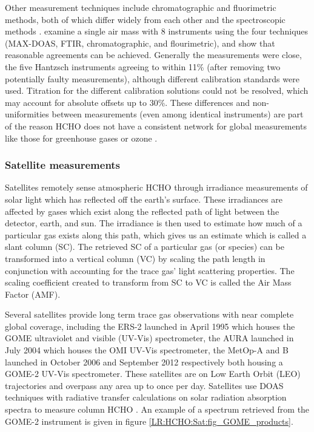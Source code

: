     Other measurement techniques include chromatographic and fluorimetric methods, both of which differ widely from each other and the spectroscopic methods \parencite{Hak2005}.
    \textcite{Hak2005} examine a single air mass with 8 instruments using the four techniques (MAX-DOAS, FTIR, chromatographic, and flourimetric), and show that reasonable agreements can be achieved.
    Generally the measurements were close, the five Hantzsch instruments agreeing to within 11\% (after removing two potentially faulty measurements), although different calibration standards were used.
    Titration for the different calibration solutions could not be resolved, which may account for absolute offsets up to 30\%.
    These differences and non-uniformities between measurements (even among identical instruments) are part of the reason HCHO does not have a consistent network for global measurements like those for greenhouse gases or ozone \parencite{FortemsCheiney2012}.
  
    \subsubsection{Satellite measurements}
      \label{LR:HCHO:Sat}
      
      Satellites remotely sense atmospheric HCHO through irradiance measurements of solar light which has reflected off the earth's surface. 
      These irradiances are affected by gases which exist along the reflected path of light between the detector, earth, and sun. 
      The irradiance is then used to estimate how much of a particular gas exists along this path, which gives us an estimate which is called a slant column (SC).
      The retrieved SC of a particular gas (or species) can be transformed into a vertical column (VC) by scaling the path length in conjunction with accounting for the trace gas' light scattering properties.
      The scaling coefficient created to transform from SC to VC is called the Air Mass Factor (AMF).
      
      Several satellites provide long term trace gas observations with near complete global coverage, including the ERS-2 launched in April 1995 which houses the GOME ultraviolet and visible (UV-Vis) spectrometer, the AURA launched in July 2004 which houses the OMI UV-Vis spectrometer, the MetOp-A and B launched in October 2006 and September 2012 respectively both housing a GOME-2 UV-Vis spectrometer.
      These satellites are on Low Earth Orbit (LEO) trajectories and overpass any area up to once per day.
      Satellites use DOAS techniques with radiative transfer calculations on solar radiation absorption spectra to measure column HCHO .
      An example of a spectrum retrieved from the GOME-2 instrument is given in figure \ref{LR:HCHO:Sat:fig_GOME_products}.
      
